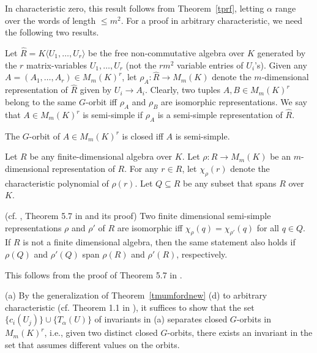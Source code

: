 \documentclass[11pt]{article}
\begin{document}
In characteristic zero, this result follows  from  Theorem~\ref{tprf}, 
letting  $\alpha$ range over the words of length $\le m^2$.
For a proof in arbitrary characteristic, we  need the following two results.



Let $\hat R=K\langle U_1,\ldots,U_r\rangle$ be the free non-commutative algebra over $K$ generated by the $r$ 
matrix-variables $U_1,\ldots,U_r$ (not the $r m^2$ variable entries of $U_i$'s).
Given any $A=(A_1,\ldots,A_r) \in M_m(K)^r$, let $\rho_A: \hat R \rightarrow M_m(K)$ 
denote the $m$-dimensional representation of $\hat R$ given by $U_i \rightarrow A_i$. 
Clearly, two tuples $A, B \in M_m(K)^r$ belong to the same $G$-orbit iff $\rho_A$ and $\rho_B$ are isomorphic representations.
We say that $A \in M_m(K)^r$ is semi-simple if $\rho_A$ is a semi-simple representation of $\hat R$.

\begin{theorem}  
\label{tartin}

The $G$-orbit of $A \in M_m(K)^r$ is  closed iff $A$ is semi-simple.
\end{theorem}

Let $R$ be  any finite-dimensional algebra over $K$. Let 
$\rho: R \rightarrow M_m(K)$ be an   $m$-dimensional representation of $R$.
For any  $r \in R$, let $\chi_\rho(r)$ denote the characteristic polynomial of $\rho(r)$.
Let $Q \subseteq R$ be any subset that spans $R$ over $K$. 

\begin{theorem} (cf. \cite{brauer},  Theorem 5.7 in \cite{eggermont} and its proof) \label {tbrauer}
Two finite dimensional semi-simple representations $\rho$ and $\rho'$ of $R$ are isomorphic iff $\chi_\rho(q)=\chi_{\rho'}(q)$ 
for all $q \in Q$.
If $R$ is not a finite dimensional algebra, then the same statement also holds if $\rho(Q)$ and $\rho'(Q)$ span $\rho(R)$ and 
$\rho'(R)$, respectively.
\end{theorem}

This follows from the proof of Theorem 5.7 in \cite{eggermont}.


\noindent (a) By  the generalization of Theorem~\ref{tmumfordnew} (d) to
arbitrary characteristic 
(cf.  Theorem 1.1 in  \cite{mumford}),
it suffices to show that the set 
$\{c_i(U_j)\} \cup \{T_\alpha(U)\}$ of invariants in (a)
separates closed $G$-orbits in $M_m(K)^r$, i.e.,  given two distinct closed $G$-orbits, there exists an invariant in the
set that assumes different values on the orbits.
\end{document}
